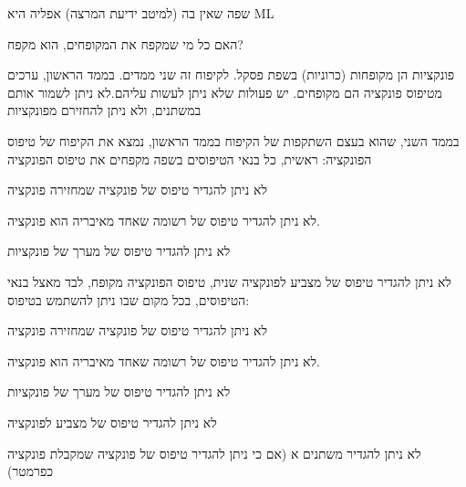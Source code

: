       שפה שאין בה (למיטב ידיעת המרצה) אפליה היא ML

      האם כל מי שמקפח את המקופחים, הוא מקפח?

      \begin{ציינון}
\item פונקציות הן מקופחות (כרוניות) בשפת פסקל. לקיפוח זה שני ממדים.
      בממד הראשון, ערכים מטיפוס פונקציה הם מקופחים. יש פעולות שלא ניתן לעשות עליהם.לא ניתן לשמור אותם במשתנים, ולא ניתן להחזירם מפונקציות
  \end{ציינון}

      בממד השני, שהוא בעצם השתקפות של הקיפוח בממד הראשון, נמצא את הקיפוח של טיפוס הפונקציה:
      ראשית, כל בנאי הטיפוסים בשפה מקפחים את טיפוס הפונקציה
      \begin{ציינון}
\item לא ניתן להגדיר טיפוס של פונקציה שמחזירה פונקציה
\item * לא ניתן להגדיר טיפוס של רשומה שאחד מאיבריה הוא פונקציה.
\item לא ניתן להגדיר טיפוס של מערך של פונקציות
\item לא ניתן להגדיר טיפוס של מצביע לפונקציה
      שנית, טיפוס הפונקציה מקופח, לבד מאצל בנאי הטיפוסים, בכל מקום שבו ניתן להשתמש בטיפוס:
\item לא ניתן להגדיר טיפוס של פונקציה שמחזירה פונקציה
\item * לא ניתן להגדיר טיפוס של רשומה שאחד מאיבריה הוא פונקציה.
\item לא ניתן להגדיר טיפוס של מערך של פונקציות
\item לא ניתן להגדיר טיפוס של מצביע לפונקציה
    \end{ציינון}

      לא ניתן להגדיר משתנים א
      (אם כי ניתן להגדיר טיפוס של פונקציה שמקבלת פונקציה כפרמטר)


